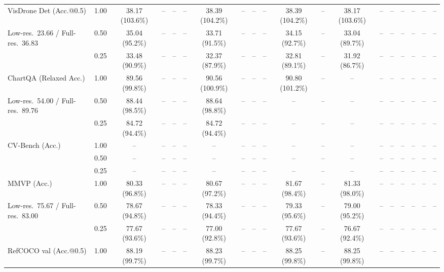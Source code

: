 \begin{table}[t]
{\begin{tabular}{l c | c c c c | c c c c | c c | c c c | c c c c}
\cmidrule(lr){1-19}
VisDrone Det (Acc.@0.5) & 1.00 & \cellcolor{gray!15}38.17 (103.6\%) & -- & -- & -- & \cellcolor{gray!15}38.39 (104.2\%) & -- & -- & -- & \cellcolor{gray!15}38.39 (104.2\%) & -- & \cellcolor{gray!15}38.17 (103.6\%) & -- & -- & -- & -- & -- & -- \\
{\footnotesize Low-res.\ 23.66 / Full-res.\ 36.83} & 0.50 & 35.04 (95.2\%) & -- & -- & -- & 33.71 (91.5\%) & -- & -- & -- & 34.15 (92.7\%) & -- & 33.04 (89.7\%) & -- & -- & -- & -- & -- & -- \\
 & 0.25 & 33.48 (90.9\%) & -- & -- & -- & 32.37 (87.9\%) & -- & -- & -- & 32.81 (89.1\%) & -- & 31.92 (86.7\%) & -- & -- & -- & -- & -- & -- \\
\cmidrule(lr){1-19}
ChartQA (Relaxed Acc.) & 1.00 & \cellcolor{gray!15}89.56 (99.8\%) & -- & -- & -- & \cellcolor{gray!15}90.56 (100.9\%) & -- & -- & -- & \cellcolor{gray!15}90.80 (101.2\%) & -- & -- & -- & -- & -- & -- & -- & -- \\
{\footnotesize Low-res.\ 54.00 / Full-res.\ 89.76} & 0.50 & \cellcolor{gray!15}88.44 (98.5\%) & -- & -- & -- & \cellcolor{gray!15}88.64 (98.8\%) & -- & -- & -- & -- & -- & -- & -- & -- & -- & -- & -- & -- \\
 & 0.25 & 84.72 (94.4\%) & -- & -- & -- & 84.72 (94.4\%) & -- & -- & -- & -- & -- & -- & -- & -- & -- & -- & -- & -- \\
\cmidrule(lr){1-19}
CV-Bench (Acc.) & 1.00 & -- & -- & -- & -- & -- & -- & -- & -- & -- & -- & -- & -- & -- & -- & -- & -- & -- \\
 & 0.50 & -- & -- & -- & -- & -- & -- & -- & -- & -- & -- & -- & -- & -- & -- & -- & -- & -- \\
 & 0.25 & -- & -- & -- & -- & -- & -- & -- & -- & -- & -- & -- & -- & -- & -- & -- & -- & -- \\
\cmidrule(lr){1-19}
MMVP (Acc.) & 1.00 & 80.33 (96.8\%) & -- & -- & -- & 80.67 (97.2\%) & -- & -- & -- & \cellcolor{gray!15}81.67 (98.4\%) & -- & 81.33 (98.0\%) & -- & -- & -- & -- & -- & -- \\
{\footnotesize Low-res.\ 75.67 / Full-res.\ 83.00} & 0.50 & 78.67 (94.8\%) & -- & -- & -- & 78.33 (94.4\%) & -- & -- & -- & 79.33 (95.6\%) & -- & 79.00 (95.2\%) & -- & -- & -- & -- & -- & -- \\
 & 0.25 & 77.67 (93.6\%) & -- & -- & -- & 77.00 (92.8\%) & -- & -- & -- & 77.67 (93.6\%) & -- & 76.67 (92.4\%) & -- & -- & -- & -- & -- & -- \\
\cmidrule(lr){1-19}
RefCOCO val (Acc.@0.5) & 1.00 & \cellcolor{gray!15}88.19 (99.7\%) & -- & -- & -- & \cellcolor{gray!15}88.23 (99.7\%) & -- & -- & -- & \cellcolor{gray!15}88.25 (99.8\%) & -- & \cellcolor{gray!15}88.25 (99.8\%) & -- & -- & -- & -- & -- & -- \\

\end{tabular}}
\end{table}
